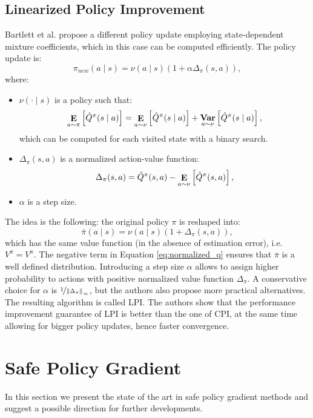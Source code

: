 \subsection{Linearized Policy Improvement}
Bartlett et al. \cite{abbasi2016fast} propose a different policy update employing state-dependent mixture coefficients, which in this case can be computed efficiently.
The policy update is:
\[
	\pi_{new}(a \mid s) = \nu(a \mid s)(1+\alpha\Delta_{\pi}(s,a)),
\]
where:
\begin{itemize}
\item $\nu(\cdot \mid s)$ is a policy such that:
\begin{equation}\label{eq:same_value}
\expected{a}{\pi}{\hat{Q}^{\pi}(s \mid a)} = \expected{a}{\nu}{\hat{Q}^{\pi}(s \mid a)} + 
	\mathop{\mathbf{Var}}\limits_{a \sim \nu}\left[\hat{Q}^{\pi}(s \mid a)\right],
\end{equation}
which can be computed for each visited state with a binary search.
\item $\Delta_\pi(s,a)$ is a normalized action-value function:
\begin{equation}\label{eq:normalized_q}
	\Delta_\pi(s,a) = \hat{Q}^\pi(s,a) - \expected{a}{\nu}{\hat{Q}^\pi(s,a)},
\end{equation}
\item $\alpha$ is a step size.
\end{itemize}
The idea is the following: the original policy $\pi$ is reshaped into:
\[
	\overline{\pi}(a \mid s) = \nu(a \mid s)(1+\Delta_{\pi}(s,a)),
\]
which has the same value function (in the absence of estimation error), i.e.\ $V^{\overline{\pi}} = V^\pi$. The negative term in Equation \ref{eq:normalized_q} ensures that $\overline{\pi}$ is a well defined distribution. Introducing a step size $\alpha$ allows to assign higher probability to actions with positive normalized value function $\Delta_\pi$. A conservative choice for $\alpha$ is $\nicefrac{1}{\norm[\infty]{\Delta_\pi}}$, but the authors also propose more practical alternatives.
The resulting algorithm is called \ac{LPI}. The authors show that the performance improvement guarantee of \ac{LPI} is better than the one of \ac{CPI}, at the same time allowing for bigger policy updates, hence faster convergence.

\section{Safe Policy Gradient}\label{sec:spg}
In this section we present the state of the art in safe policy gradient methods and suggest a possible direction for further developments.

